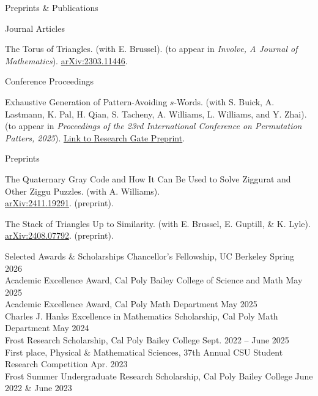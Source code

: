 \documentclass[
	11pt, %
]{cv} %
\begin{document}
\begin{rSection}{Preprints \& Publications}
	\begin{rSubsectionNumbered}{Journal Articles}
		\item The Torus of Triangles. (with E. Brussel). (to appear in \emph{Involve, A Journal of Mathematics}).	\href{http://arxiv.org/abs/2303.11446}{arXiv:2303.11446}.	
	\end{rSubsectionNumbered}
	\begin{rSubsectionNumbered}{Conference Proceedings}
		\item Exhaustive Generation of Pattern-Avoiding $s$-Words. (with S. Buick, A. Lastmann, K. Pal, H. Qian, S. Tacheny, A. Williams, L. Williams, and Y. Zhai). (to appear in \textit{Proceedings of the 23rd International Conference on Permutation Patters, 2025}). \href{https://www.researchgate.net/publication/391522113_Exhaustive_Generation_of_Pattern-Avoiding_s-Words}{Link to \underline{Research Gate Preprint}}.
	\end{rSubsectionNumbered}
	\begin{rSubsectionNumbered}{Preprints}
		\item The Quaternary Gray Code and How It Can Be Used to Solve Ziggurat and Other Ziggu Puzzles. (with A. Williams).\\ \href{http://arxiv.org/abs/2411.19291}{arXiv:2411.19291}. (preprint).
		\item The Stack of Triangles Up to Similarity. (with E. Brussel, E. Guptill, \& K. Lyle). \href{http://arxiv.org/abs/2408.07792}{arXiv:2408.07792}. (preprint).		
	\end{rSubsectionNumbered}
\end{rSection}
\begin{rSection}{Selected Awards \& Scholarships}
	Chancellor's Fellowship, UC Berkeley \dotfill Spring 2026 \\
	Academic Excellence Award, Cal Poly Bailey College of Science and Math \dotfill May 2025 \\
	Academic Excellence Award, Cal Poly Math Department \dotfill May 2025 \\
	Charles J. Hanks Excellence in Mathematics Scholarship, Cal Poly Math Department \dotfill May 2024 \\
	Frost Research Scholarship, Cal Poly Bailey College \dotfill Sept. 2022 -- June 2025 \\
	First place, Physical \& Mathematical Sciences, 37th Annual CSU Student Research Competition \dotfill Apr. 2023 \\
	Frost Summer Undergraduate Research Scholarship, Cal Poly Bailey College \dotfill June 2022 \& June 2023
\end{rSection}
\end{document}
